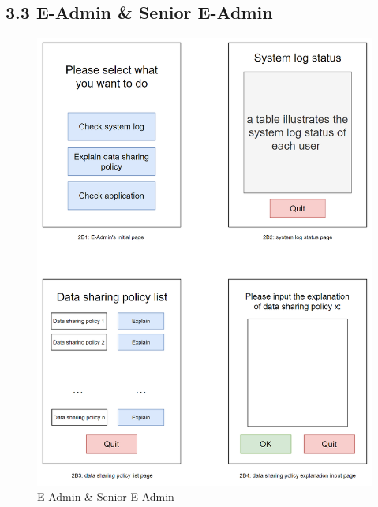 \documentclass[a4paper,12pt]{article}
\begin{document}
\subsection*{3.3 E-Admin \& Senior E-Admin}
\begin{figure}[H]
    \begin{center}
        \includegraphics[width=\textwidth]{picture/892379.png}
        \caption{E-Admin \& Senior E-Admin}
        \label{fig:access-thesis}
    \end{center}
\end{figure}
\end{document}
